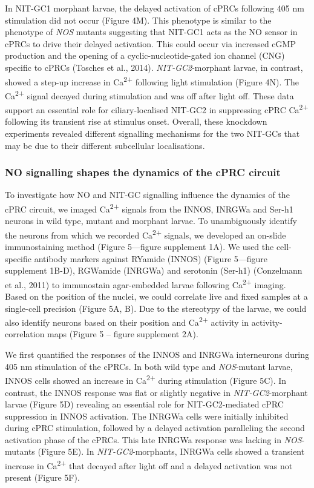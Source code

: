\documentclass[
  11pt,
  letterpaper,
  DIV=11,
  numbers=noendperiod]{scrartcl}
\begin{document}
In NIT-GC1 morphant larvae, the delayed activation of cPRCs following
405 nm stimulation did not occur (Figure 4M). This phenotype is similar
to the phenotype of \emph{NOS} mutants suggesting that NIT-GC1 acts as
the NO sensor in cPRCs to drive their delayed activation. This could
occur via increased cGMP production and the opening of a
cyclic-nucleotide-gated ion channel (CNG) specific to cPRCs (Tosches et
al., 2014). \emph{NIT-GC2}-morphant larvae, in contrast, showed a
step-up increase in Ca\textsuperscript{2+} following light stimulation
(Figure 4N). The Ca\textsuperscript{2+} signal decayed during
stimulation and was off after light off. These data support an essential
role for ciliary-localised NIT-GC2 in suppressing cPRC
Ca\textsuperscript{2+} following its transient rise at stimulus onset.
Overall, these knockdown experiments revealed different signalling
mechanisms for the two NIT-GCs that may be due to their different
subcellular localisations.

\subsubsection{NO signalling shapes the dynamics of the cPRC
circuit}\label{no-signalling-shapes-the-dynamics-of-the-cprc-circuit}

To investigate how NO and NIT-GC signalling influence the dynamics of
the cPRC circuit, we imaged Ca\textsuperscript{2+} signals from the
INNOS, INRGWa and Ser-h1 neurons in wild type, mutant and morphant
larvae. To unambiguously identify the neurons from which we recorded
Ca\textsuperscript{2+} signals, we developed an on-slide immunostaining
method (Figure 5---figure supplement 1A). We used the cell-specific
antibody markers against RYamide (INNOS) (Figure 5---figure supplement
1B-D), RGWamide (INRGWa) and serotonin (Ser-h1) (Conzelmann et al.,
2011) to immunostain agar-embedded larvae following
Ca\textsuperscript{2+} imaging. Based on the position of the nuclei, we
could correlate live and fixed samples at a single-cell precision
(Figure 5A, B). Due to the stereotypy of the larvae, we could also
identify neurons based on their position and Ca\textsuperscript{2+}
activity in activity-correlation maps (Figure 5 -- figure supplement
2A).

We first quantified the responses of the INNOS and INRGWa interneurons
during 405 nm stimulation of the cPRCs. In both wild type and
\emph{NOS}-mutant larvae, INNOS cells showed an increase in
Ca\textsuperscript{2+} during stimulation (Figure 5C). In contrast, the
INNOS response was flat or slightly negative in \emph{NIT-GC2}-morphant
larvae (Figure 5D) revealing an essential role for NIT-GC2-mediated cPRC
suppression in INNOS activation. The INRGWa cells were initially
inhibited during cPRC stimulation, followed by a delayed activation
paralleling the second activation phase of the cPRCs. This late INRGWa
response was lacking in \emph{NOS}-mutants (Figure 5E). In
\emph{NIT-GC2}-morphants, INRGWa cells showed a transient increase in
Ca\textsuperscript{2+} that decayed after light off and a delayed
activation was not present (Figure 5F).
\end{document}
